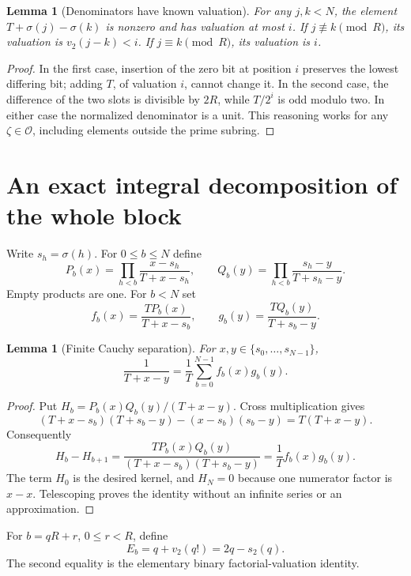 \documentclass[11pt,letterpaper]{article}
\newtheorem{lemma}[theorem]{Lemma}
\theoremstyle{definition}\newtheorem{definition}[theorem]{Definition}
\theoremstyle{remark}\newtheorem{remark}[theorem]{Remark}
\newcommand{\OO}{\mathcal O}
\newcommand{\vTwo}{v_2}
\begin{document}
\begin{lemma}[Denominators have known valuation]\label{lem:denom}
For any $j,k<N$, the element $T+\sigma(j)-\sigma(k)$ is nonzero and
has valuation at most $i$. If $j\not\equiv k\pmod R$, its valuation is
$\vTwo(j-k)<i$. If $j\equiv k\pmod R$, its valuation is $i$.
\end{lemma}
\begin{proof}
In the first case, insertion of the zero bit at position $i$ preserves the
lowest differing bit; adding $T$, of valuation $i$, cannot change it. In the
second case, the difference of the two slots is divisible by $2R$, while
$T/2^i$ is odd modulo two. In either case the normalized denominator is a
unit. This reasoning works for any $\zeta\in\OO$, including elements
outside the prime subring.
\end{proof}

\section{An exact integral decomposition of the whole block}
\label{sec:decomposition}

Write $s_h=\sigma(h)$. For $0\le b\le N$ define
\[
 P_b(x)=\prod_{h<b}\frac{x-s_h}{T+x-s_h},\qquad
 Q_b(y)=\prod_{h<b}\frac{s_h-y}{T+s_h-y}.
\]
Empty products are one. For $b<N$ set
\begin{equation}\label{eq:fg}
 f_b(x)=\frac{T P_b(x)}{T+x-s_b},\qquad
 g_b(y)=\frac{T Q_b(y)}{T+s_b-y}.
\end{equation}

\begin{lemma}[Finite Cauchy separation]\label{lem:separation}
For $x,y\in\{s_0,\ldots,s_{N-1}\}$,
\begin{equation}\label{eq:sep}
 \frac{1}{T+x-y}=\frac1T\sum_{b=0}^{N-1}f_b(x)g_b(y).
\end{equation}
\end{lemma}
\begin{proof}
Put $H_b=P_b(x)Q_b(y)/(T+x-y)$. Cross multiplication gives
\[
 (T+x-s_b)(T+s_b-y)-(x-s_b)(s_b-y)=T(T+x-y).
\]
Consequently
\[
 H_b-H_{b+1}
 =\frac{T P_b(x)Q_b(y)}{(T+x-s_b)(T+s_b-y)}
 =\frac1T f_b(x)g_b(y).
\]
The term $H_0$ is the desired kernel, and $H_N=0$ because one numerator
factor is $x-x$. Telescoping proves the identity without an infinite series
or an approximation.
\end{proof}

For $b=qR+r$, $0\le r<R$, define
\begin{equation}\label{eq:E}
 E_b=q+\vTwo(q!)=2q-s_2(q).
\end{equation}
The second equality is the elementary binary factorial-valuation identity.
\end{document}
